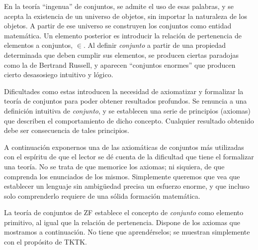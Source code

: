 En la teoría ``ingenua'' de conjuntos, se admite el uso de esas palabras, y
se acepta la existencia de un universo de objetos, sin importar la
naturaleza de los objetos. A partir de ese universo se construyen los
conjuntos como entidad matemática. Un elemento posterior es introducir la
relación de pertenencia de elementos a conjuntos, $\in$. Al definir
\emph{conjunto} a partir de una propiedad determinada que deben cumplir sus
elementos, se producen ciertas paradojas como la de Bertrand Russell, y
aparecen ``conjuntos enormes'' que producen cierto desasosiego intuitivo y
lógico.

Dificultades como estas introducen la necesidad de axiomatizar y formalizar
la teoría de conjuntos para poder obtener resultados profundos. Se renuncia
a una definición intuitiva de \emph{conjunto}, y se establecen una serie de
principios (axiomas) que describen el comportamiento de dicho concepto.
Cualquier resultado obtenido debe ser consecuencia de tales principios.

A continuación exponernos una de las axiomáticas de conjuntos más utilizadas
con el espíritu de que el lector se dé cuenta de la dificultad que tiene el
formalizar una teoría. No se trata de que memorice los axiomas; ni siquiera,
de que comprenda los enunciados de los mismos. Simplemente queremos que vea
que establecer un lenguaje sin ambigüedad precisa un esfuerzo enorme, y que
incluso solo comprenderlo requiere de una sólida formación matemática.

La teoría de conjuntos de ZF establece el concepto de \emph{conjunto} como
elemento primitivo, al igual que la relación de pertenencia. Dispone de los
axiomas que mostramos a continuación. No tiene que aprendérselos; se
muestran simplemente con el propósito de TKTK.

